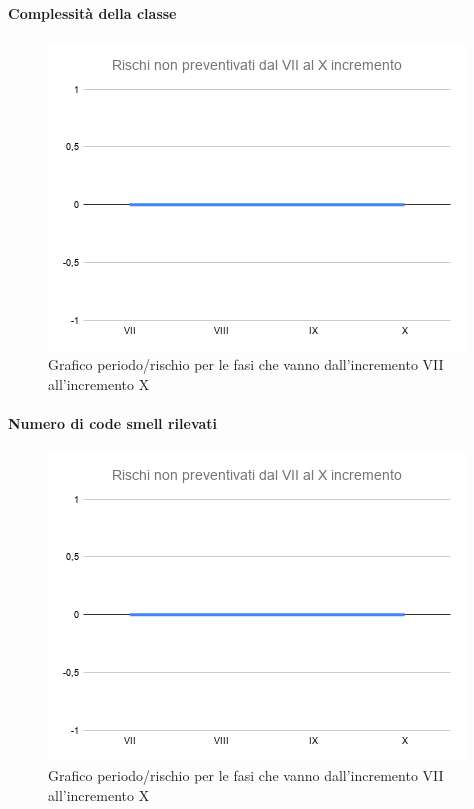 \paragraph{Complessità della classe}
\begin{figure}[H]
			\centering%
			\includegraphics[width=0.8\linewidth]{./res/images/RischiNonPreven_4.png}
			\caption{Grafico periodo/rischio per le fasi che vanno dall'incremento VII all'incremento X}
			\label{fig:Grafico periodo/rischio per le fasi che vanno dall'incremento VII all'incremento X}
	\end{figure}
\paragraph{Numero di code smell rilevati}
\begin{figure}[H]
			\centering%
			\includegraphics[width=0.8\linewidth]{./res/images/RischiNonPreven_4.png}
			\caption{Grafico periodo/rischio per le fasi che vanno dall'incremento VII all'incremento X}
			\label{fig:Grafico periodo/rischio per le fasi che vanno dall'incremento VII all'incremento X}
	\end{figure}

